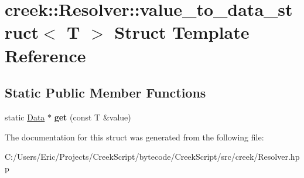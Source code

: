 \hypertarget{structcreek_1_1_resolver_1_1value__to__data__struct}{}\section{creek\+:\+:Resolver\+:\+:value\+\_\+to\+\_\+data\+\_\+struct$<$ T $>$ Struct Template Reference}
\label{structcreek_1_1_resolver_1_1value__to__data__struct}
\subsection*{Static Public Member Functions}
\begin{DoxyCompactItemize}
\item 
static \hyperlink{classcreek_1_1_data}{Data} $\ast$ {\bfseries get} (const T \&value)\hypertarget{structcreek_1_1_resolver_1_1value__to__data__struct_ae7a8ad4f7726753678ad98927b833b91}{}\label{structcreek_1_1_resolver_1_1value__to__data__struct_ae7a8ad4f7726753678ad98927b833b91}

\end{DoxyCompactItemize}


The documentation for this struct was generated from the following file\+:\begin{DoxyCompactItemize}
\item 
C\+:/\+Users/\+Eric/\+Projects/\+Creek\+Script/bytecode/\+Creek\+Script/src/creek/Resolver.\+hpp\end{DoxyCompactItemize}
